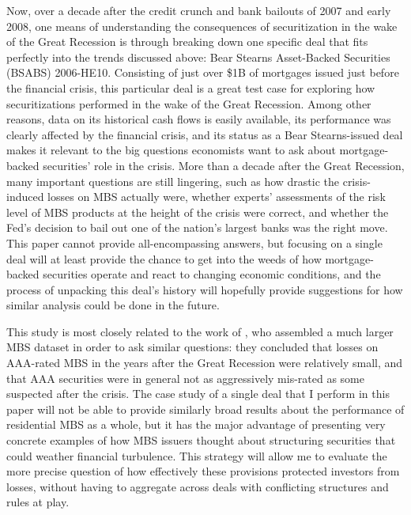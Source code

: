 \documentclass[12pt]{article}
\begin{document}
Now, over a decade after the credit crunch and bank bailouts of 2007 and early 2008, one means of understanding the consequences of securitization in the wake of the Great Recession is through breaking down one specific deal that fits perfectly into the trends discussed above: Bear Stearns Asset-Backed Securities (BSABS) 2006-HE10. Consisting of just over \$1B of mortgages issued just before the financial crisis, this particular deal is a great test case for exploring how securitizations performed in the wake of the Great Recession. Among other reasons, data on its historical cash flows is easily available, its performance was clearly affected by the financial crisis, and its status as a Bear Stearns-issued deal makes it relevant to the big questions economists want to ask about mortgage-backed securities’ role in the crisis. More than a decade after the Great Recession, many important questions are still lingering, such as how drastic the crisis-induced losses on MBS actually were, whether experts’ assessments of the risk level of MBS products at the height of the crisis were correct, and whether the Fed’s decision to bail out one of the nation’s largest banks was the right move. This paper cannot provide all-encompassing answers, but focusing on a single deal will at least provide the chance to get into the weeds of how mortgage-backed securities operate and react to changing economic conditions, and the process of unpacking this deal's history will hopefully provide suggestions for how similar analysis could be done in the future.

This study is most closely related to the work of \textcite{ospina18}, who assembled a much larger MBS dataset in order to ask similar questions: they concluded that losses on AAA-rated MBS in the years after the Great Recession were relatively small, and that AAA securities were in general not as aggressively mis-rated as some suspected after the crisis. The case study of a single deal that I perform in this paper will not be able to provide similarly broad results about the performance of residential MBS as a whole, but it has the major advantage of presenting very concrete examples of how MBS issuers thought about structuring securities that could weather financial turbulence. This strategy will allow me to evaluate the more precise question of how effectively these provisions protected investors from losses, without having to aggregate across deals with conflicting structures and rules at play.
\end{document}
